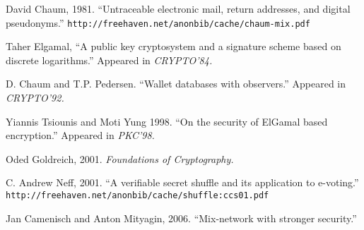 \documentclass[letter]{article}
\begin{document}
\begin{thebibliography}{99}

   David Chaum, 1981. ``Untraceable electronic mail, return addresses, and digital pseudonyms.''
    {\tt http://freehaven.net/anonbib/cache/chaum-mix.pdf}

   Taher Elgamal, ``A public key cryptosystem and a signature
    scheme based on discrete logarithms.'' Appeared in \textit{CRYPTO'84.}

    D. Chaum and T.P. Pedersen. ``Wallet databases with
    observers.'' Appeared in \textit{CRYPTO'92.}

   Yiannis Tsiounis and Moti Yung 1998. ``On the security of
    ElGamal based encryption.'' Appeared in \textit{PKC'98.}

   Oded Goldreich, 2001. \textit{Foundations of Cryptography.}

   C. Andrew Neff, 2001. ``A verifiable secret shuffle and its application to e-voting.'' {\tt http://freehaven.net/anonbib/cache/shuffle:ccs01.pdf}

   Jan Camenisch and Anton Mityagin, 2006. ``Mix-network with
    stronger security.''

\end{thebibliography}
\end{document}
